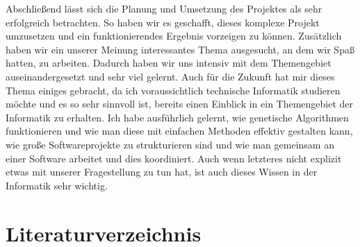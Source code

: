 \documentclass[a4paper, 11pt]{scrartcl}
\begin{document}
Abschließend lässt sich die Planung und Umsetzung des Projektes als sehr erfolgreich betrachten. So haben wir es geschafft, dieses komplexe Projekt umzusetzen und ein funktionierendes Ergebnis vorzeigen zu können. Zusätzlich haben wir ein unserer Meinung interessantes Thema ausgesucht, an dem wir Spaß hatten, zu arbeiten. Dadurch haben wir uns intensiv mit dem Themengebiet auseinandergesetzt und sehr viel gelernt. Auch für die Zukunft hat mir dieses Thema einiges gebracht, da ich voraussichtlich technische Informatik studieren möchte und es so sehr sinnvoll ist, bereits einen Einblick in ein Themengebiet der Informatik zu erhalten. Ich habe ausführlich gelernt, wie genetische Algorithmen funktionieren und wie man diese mit einfachen Methoden effektiv gestalten kann, wie große Softwareprojekte zu strukturieren sind und wie man gemeinsam an einer Software arbeitet und dies koordiniert. Auch wenn letzteres nicht explizit etwas mit unserer Fragestellung zu tun hat, ist auch dieses Wissen in der Informatik sehr wichtig.



\newpage
\section{Literaturverzeichnis}

\renewcommand{\section}[2]{} %
\nocite{*}
\printbibliography



\end{document}
